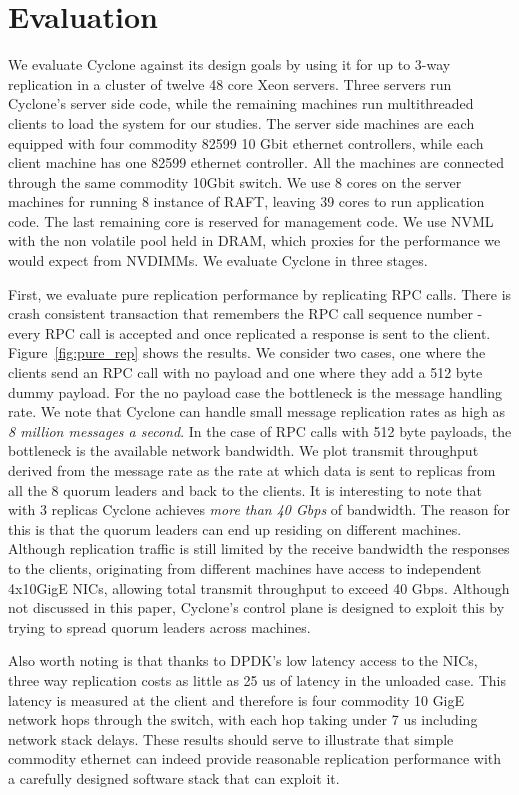 \documentclass[letterpaper,twocolumn,10pt]{article}
\begin{document}
\section{Evaluation}
We evaluate Cyclone against its design goals by using it for up to 3-way
replication in a cluster of twelve 48 core Xeon servers. Three servers run
Cyclone's server side code, while the remaining machines run multithreaded
clients to load the system for our studies. The server side machines are each
equipped with four commodity 82599 10 Gbit ethernet controllers, while each
client machine has one 82599 ethernet controller. All the machines are connected
through the same commodity 10Gbit switch. We use 8 cores on the server machines
for running 8 instance of RAFT, leaving 39 cores to run application code. The
last remaining core is reserved for management code. We use NVML with the non
volatile pool held in DRAM, which proxies for the performance we would expect
from NVDIMMs. We evaluate Cyclone in three stages.

First, we evaluate pure replication performance by replicating RPC calls. There
is crash consistent transaction that remembers the RPC call sequence number -
every RPC call is accepted and once replicated a response is sent to the
client. Figure~\ref{fig:pure_rep} shows the results. We consider two cases, one
where the clients send an RPC call with no payload and one where they add a 512
byte dummy payload. For the no payload case the bottleneck is the message
handling rate. We note that Cyclone can handle small message replication rates
as high as \emph{8 million messages a second}. In the case of RPC calls with 512
byte payloads, the bottleneck is the available network bandwidth. We plot
transmit throughput derived from the message rate as the rate at which data is
sent to replicas from all the 8 quorum leaders and back to the clients.
It is interesting to note that with 3 replicas Cyclone achieves \emph{more than
  40 Gbps} of bandwidth. The reason for this is that the quorum leaders can end
up residing on different machines. Although replication traffic is still limited
by the receive bandwidth the responses to the clients, originating from
different machines have access to independent 4x10GigE NICs, allowing total
transmit throughput to exceed 40 Gbps. Although not discussed in this paper,
Cyclone's control plane is designed to exploit this by trying to spread quorum
leaders across machines.

Also worth noting is that thanks to DPDK's low latency access to the NICs, three
way replication costs as little as 25 us of latency in the unloaded case. This
latency is measured at the client and therefore is four commodity 10 GigE
network hops through the switch, with each hop taking under 7 us including
network stack delays. These results should serve to illustrate that simple
commodity ethernet can indeed provide reasonable replication performance with a
carefully designed software stack that can exploit it.
\end{document}
